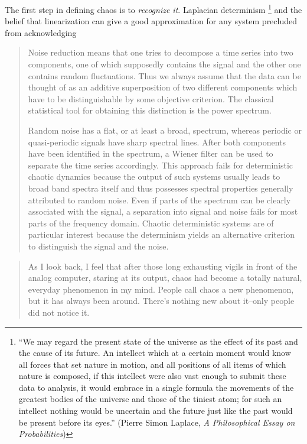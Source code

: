 \documentclass[10pt,twoside,draft]{book}
\begin{document}
The first step in defining chaos is to \textit{recognize it}.
Laplacian determinism 
\footnote{``We may regard the present state of the universe as the effect of its past and the cause of its future. An intellect which at a certain moment would know all forces that set nature in motion, and all positions of all items of which nature is composed, if this intellect were also vast enough to submit these data to analysis, it would embrace in a single formula the movements of the greatest bodies of the universe and those of the tiniest atom; for such an intellect nothing would be uncertain and the future just like the past would be present before its eyes.''
  (Pierre Simon Laplace, \textit{A Philosophical Essay on Probabilities})}
\citep{stone} and the belief that linearization can give a good approximation for any system precluded from acknowledging
\citet[p.51]{kantz-schreiber}
\begin{quotation}
  Noise reduction means that one tries to decompose a time series into two components, one of which supposedly contains the signal and the other one contains random fluctuations.
  Thus we always assume that the data can be thought of as an additive superposition of two different components which have to be distinguishable by some objective criterion.
  The classical statistical tool for obtaining this distinction is the power spectrum.

  Random noise has a flat, or at least a broad, spectrum, whereas periodic or quasi-periodic signals have sharp spectral lines.
  After both components have been identified in the spectrum, a Wiener filter can be used to separate the time series accordingly.
  This approach fails for deterministic chaotic dynamics because the output of such systems usually leads to broad band spectra itself and thus possesses spectral properties generally attributed to random noise.
  Even if parts of the spectrum can be clearly associated with the signal, a separation into signal and noise fails for most parts of the frequency domain.
  Chaotic deterministic systems are of particular interest because the determinism yields an alternative criterion to distinguish the signal and the noise. 
\end{quotation}

\begin{quotation}
As I look back, I feel that after those long exhausting vigils in front of the analog computer, staring at its output, chaos had become a totally natural, everyday phenomenon in my mind.
People call chaos a new phenomenon, but it has always been around.
There's nothing new about it--only people did not notice it.
\citep[p.27]{ueda-abraham}
\end{quotation}
\end{document}
